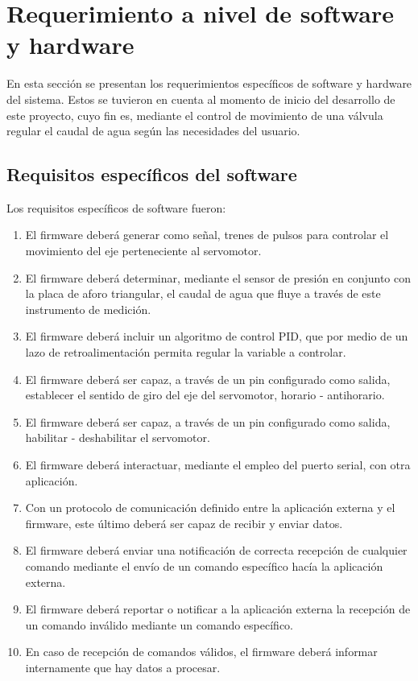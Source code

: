 \section{Requerimiento a nivel de software y hardware}
\label{sec:ejemplo}
En esta sección se presentan los requerimientos específicos de software y hardware del sistema. Estos se tuvieron en cuenta al momento de inicio del desarrollo de este proyecto, cuyo fin es, mediante el control de movimiento de una válvula regular el caudal de agua según las necesidades del usuario. 
\subsection{Requisitos específicos del software}
\label{subsec:ejemplo}


 Los requisitos específicos de software fueron:

\begin{enumerate}
	\item El firmware deberá generar como señal, trenes de pulsos para controlar el movimiento del eje perteneciente al servomotor.
	\item El firmware deberá determinar, mediante el sensor de presión en conjunto con la placa de aforo triangular, el caudal de agua que fluye a través de este instrumento de medición.
	\item  El firmware deberá incluir un algoritmo de control PID, que por medio de un lazo de retroalimentación permita regular la variable a controlar.
	\item El firmware deberá ser capaz, a través de un pin configurado como salida, establecer el sentido de giro del eje del servomotor, horario - antihorario.
	\item El firmware deberá ser capaz, a través de un pin configurado como salida, habilitar - deshabilitar el servomotor.
	\item El firmware deberá interactuar, mediante el empleo del puerto serial, con otra aplicación. 	  
	\item Con un protocolo de comunicación definido entre la aplicación externa y el firmware, este último deberá ser capaz de recibir y enviar datos.
	\item El firmware deberá enviar una notificación de correcta recepción de cualquier comando mediante el envío de un comando específico hacía la aplicación externa.  
	\item El firmware deberá reportar o notificar a la aplicación externa la recepción de un comando inválido mediante un comando específico.
	\item En caso de recepción de comandos válidos, el firmware deberá informar internamente que hay datos a procesar. 
\end{enumerate}


